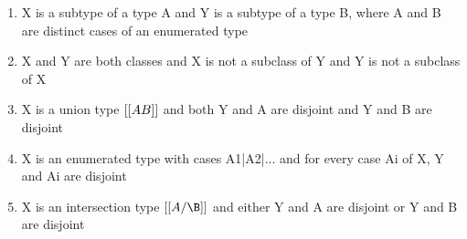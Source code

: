 \begin{enumerate}
  \item{X is a subtype of a type A and Y is a subtype of a type B, where A and B are distinct cases of an enumerated type}
  \item{X and Y are both classes and X is not a subclass of Y and Y is not a subclass of X}
  \item{X is a union type $[[A \/ B]]$ and both Y and A are disjoint and Y and B are disjoint}
  \item{X is an enumerated type with cases A1|A2|... and for every case Ai of X, Y and Ai are disjoint}
  \item{X is an intersection type $[[A/\B]]$ and either Y and A are disjoint or Y and B are disjoint}
\end{enumerate}

